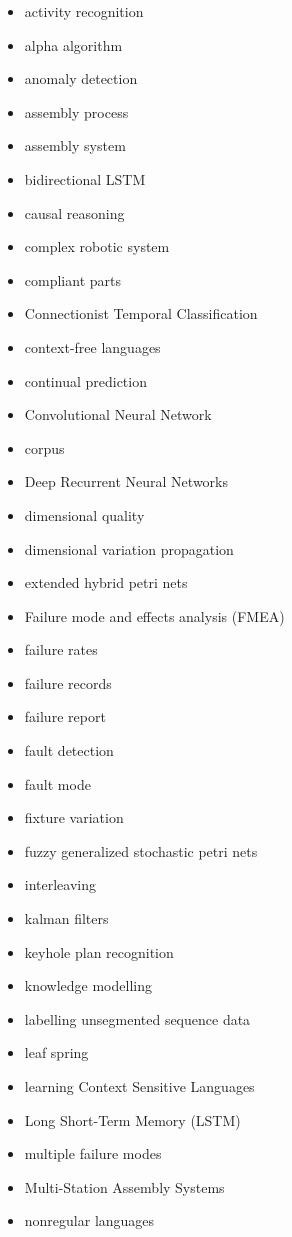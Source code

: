 \documentclass[a4paper,10pt]{article}
\begin{document}
\begin{itemize}
 \item activity recognition
 \item alpha algorithm
 \item anomaly detection
 \item assembly process
 \item assembly system
 \item bidirectional LSTM
 \item causal reasoning
 \item complex robotic system
 \item compliant parts
 \item Connectionist Temporal Classification
 \item context-free languages
 \item continual prediction
 \item Convolutional Neural Network
 \item corpus
 \item Deep Recurrent Neural Networks
 \item dimensional quality
 \item dimensional variation propagation
 \item extended hybrid petri nets
 \item Failure mode and effects analysis (FMEA)
 \item failure rates
 \item failure records
 \item failure report
 \item fault detection
 \item fault mode
 \item fixture variation
 \item fuzzy generalized stochastic petri nets
 \item interleaving
 \item kalman filters
 \item keyhole plan recognition
 \item knowledge modelling
 \item labelling unsegmented sequence data
 \item leaf spring
 \item learning Context Sensitive Languages
 \item Long Short-Term Memory (LSTM)
 \item multiple failure modes
 \item Multi-Station Assembly Systems
 \item nonregular languages

\end{itemize}
\end{document}
